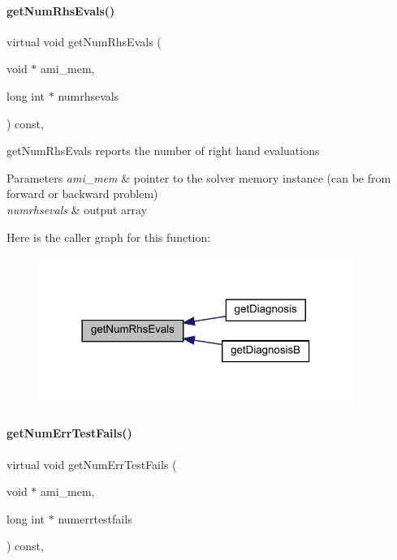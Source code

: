 \paragraph{\texorpdfstring{get\+Num\+Rhs\+Evals()}{getNumRhsEvals()}}
{\footnotesize\ttfamily virtual void get\+Num\+Rhs\+Evals (\begin{DoxyParamCaption}\item[{void $\ast$}]{ami\+\_\+mem,  }\item[{long int $\ast$}]{numrhsevals }\end{DoxyParamCaption}) const\hspace{0.3cm}{\ttfamily [protected]}, {}}

get\+Num\+Rhs\+Evals reports the number of right hand evaluations


\begin{DoxyParams}{Parameters}
{\em ami\+\_\+mem} & pointer to the solver memory instance (can be from forward or backward problem) \\
\hline
{\em numrhsevals} & output array \\
\hline
\end{DoxyParams}
Here is the caller graph for this function\+:
\nopagebreak
\begin{figure}[H]
\begin{center}
\leavevmode
\includegraphics[width=290pt]{classamici_1_1_solver_aaf8d4b1375cfa9e517ef0ec54e33d4d8_icgraph}
\end{center}
\end{figure}
\mbox{\label{classamici_1_1_solver_a605fc85e2d8183dca4ebe24f9d810516}} 
\paragraph{\texorpdfstring{get\+Num\+Err\+Test\+Fails()}{getNumErrTestFails()}}
{\footnotesize\ttfamily virtual void get\+Num\+Err\+Test\+Fails (\begin{DoxyParamCaption}\item[{void $\ast$}]{ami\+\_\+mem,  }\item[{long int $\ast$}]{numerrtestfails }\end{DoxyParamCaption}) const\hspace{0.3cm}{\ttfamily [protected]}, {}}


